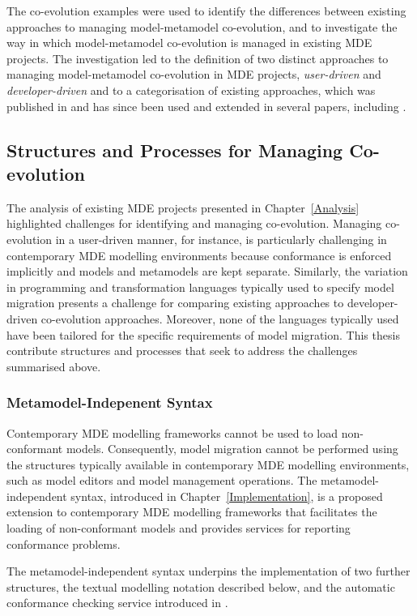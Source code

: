 The co-evolution examples were used to identify the differences between existing approaches to managing model-metamodel co-evolution, and to investigate the way in which model-metamodel co-evolution is managed in existing MDE projects. The investigation led to the definition of two distinct approaches to managing model-metamodel co-evolution in MDE projects, \emph{user-driven} and \emph{developer-driven} and to a categorisation of existing approaches, which was published in \cite{rose09analysis} and has since been used and extended in several papers, including \cite{jurack10towards,mendez10towards}.


\subsection{Structures and Processes for Managing Co-evolution}
The analysis of existing MDE projects presented in Chapter~\ref{Analysis} highlighted challenges for identifying and managing co-evolution. Managing co-evolution in a user-driven manner, for instance, is particularly challenging in contemporary MDE modelling environments because conformance is enforced implicitly and models and metamodels are kept separate. Similarly, the variation in programming and transformation languages typically used to specify model migration presents a challenge for comparing existing approaches to developer-driven co-evolution approaches. Moreover, none of the languages typically used have been tailored for the specific requirements of model migration. This thesis contribute structures and processes that seek to address the challenges summarised above.

\subsubsection{Metamodel-Indepenent Syntax}
Contemporary MDE modelling frameworks cannot be used to load non-conformant models. Consequently, model migration cannot be performed using the structures typically available in contemporary MDE modelling environments, such as model editors and model management operations. The metamodel-independent syntax, introduced in Chapter~\ref{Implementation}, is a proposed extension to contemporary MDE modelling frameworks that facilitates the loading of non-conformant models and provides services for reporting conformance problems.

The metamodel-independent syntax underpins the implementation of two further structures, the textual modelling notation described below, and the automatic conformance checking service introduced in \cite{rose10concordance}. 


